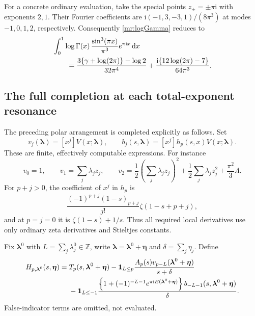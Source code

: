 \documentclass[11pt]{article}
\numberwithin{equation}{section}
\theoremstyle{plain}
\theoremstyle{definition}
\theoremstyle{remark}
\newcommand{\Z}{\mathbb Z}
\newcommand{\ii}{\mathrm i}
\newcommand{\dd}{\,\mathrm d}
\begin{document}
For a concrete ordinary evaluation, take the special points
$z_\pm=\pm\pi\ii$ with exponents $2,1$. Their Fourier coefficients are
$\ii(-1,3,-3,1)/(8\pi^3)$ at modes $-1,0,1,2$, respectively.
Consequently \eqref{mr:logGamma} reduces to
\begin{align}
 &\int_0^1\log\Gamma(x)\,
           \frac{\sin^3(\pi x)}{\pi^3}e^{\pi\ii x}\dd x\notag\\
 &\qquad=
 \frac{3\{\gamma+\log(2\pi)\}-\log2}{32\pi^4}
       +\frac{\ii\{12\log(2\pi)-7\}}{64\pi^3}.
       \label{mr:loggammaexample}
\end{align}

\subsection{The full completion at each total-exponent resonance}

The preceding polar arrangement is completed explicitly as follows.
Set
\begin{equation}\label{mr:vandb}
 v_j(\boldsymbol\lambda)=[x^j]V(x;\boldsymbol\lambda),\qquad
 b_j(s,\boldsymbol\lambda)=[x^j]h_p(s,x)V(x;\boldsymbol\lambda).
\end{equation}
These are finite, effectively computable expressions. For instance
\[
 v_0=1,\qquad v_1=\sum_j\lambda_jz_j,\qquad
 v_2=\frac12\left(\sum_j\lambda_jz_j\right)^2
       +\frac12\sum_j\lambda_jz_j^2+\frac{\pi^2}3\Lambda.
\]
For $p+j>0$, the coefficient of $x^j$ in $h_p$ is
\[
 \frac{(-1)^{p+j}(1-s)_{p+j}}{j!}\zeta(1-s+p+j),
\]
and at $p=j=0$ it is $\zeta(1-s)+1/s$. Thus all required local
derivatives use only ordinary zeta derivatives and Stieltjes constants.

Fix $\boldsymbol\lambda^0$ with
$L=\sum_j\lambda_j^0\in\Z$, write
$\boldsymbol\lambda=\boldsymbol\lambda^0+\boldsymbol\eta$ and
$\delta=\sum_j\eta_j$. Define
\begin{align}
 H_{p,\boldsymbol\lambda^0}(s,\boldsymbol\eta)
 ={}&T_p(s,\boldsymbol\lambda^0+\boldsymbol\eta)
 -\mathbf1_{L\le p}\frac{A_p(s)v_{p-L}(\boldsymbol\lambda^0+\boldsymbol\eta)}
                                  {s+\delta}\notag\\
 &-\mathbf1_{L\le-1}
 \frac{\left\{1+(-1)^{-L-1}e^{\pi\ii E(\boldsymbol\lambda^0+\boldsymbol\eta)}\right\}
       b_{-L-1}(s,\boldsymbol\lambda^0+\boldsymbol\eta)}{\delta}.
       \label{mr:H}
\end{align}
False-indicator terms are omitted, not evaluated.
\end{document}

